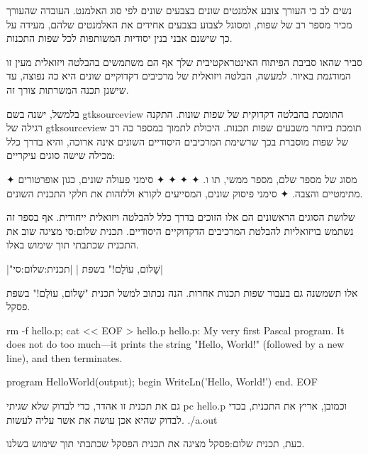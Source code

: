 נשים לב כי העורך צובע אלמנטים שונים בצבעים שונים לפי סוג האלמנט. העובדה שהעורך
מכיר מספר רב של שפות, ומסוגל לצבוע בצבעים אחידים את האלמנטים שלהם, מעידה על כך
שישנם אבני בנין יסודיות המשותפות לכל שפות התכנות.


סביר שה או סביבת הפיתוח האינטראקטיבית שלך אף הם משתמשים בהבלטה ויזואלית
מעין זו המודגמת באיור. למעשה, הבלטה ויזואלית של מרכיבים דקדוקיים שונים היא כה
נפוצה, עד שישנן  תכנה המשרתות צורך זה.

ב למשל, ישנה  בשם gtksourceview התומכת בהבלטה דקדוקית של שפות
שונות. התקנה רגילה של gtksourceview תומכת ביותר משבעים שפות תכנות. היכולת
לתמוך במספר כה רב של שפות מוסברת בכך שרשימת המרכיבים היסודיים השונים אינה
ארוכה, והיא בדרך כלל מכילה שישה סוגים עיקריים:
\begin{ספרור}
✦  מסוג של מספר שלם, מספר ממשי, תו ו.
✦ 
✦ 
✦ 
✦ סימני פעולה שונים, כגון אופרטורים מתימטיים והצבה.
✦ סימני פיסוק שונים, המסייעים לקורא ול לזהות את חלקי התכנית השונים.
\end{ספרור}
שלושת הסוגים הראשונים הם אלו הזוכים בדרך כלל להבלטה ויזואלית ייחודית. אף בספר
זה נשתמש ב ויזואליות להבלטת המרכיבים הדקדוקיים היסודיים.  תכנית
שלום:סי מציגה שוב את התכנית  שכתבתי תוך שימוש ב אלו.

\begin{תכנית}
\setLTR

\setRTL
{}|"שָׁלוֹם, עוֹלָם!" בשפת |
|תכנית:שלום:סי|
\end{תכנית}

 אלו תשמשנה גם בעבור שפות תכנות אחרות. הנה נכתוב למשל תכנית "שָׁלוֹם,
עוֹלָם!" בשפת פסקל.

\begin{קוד}
rm -f hello.p; cat << EOF > hello.p
{hello.p: My very first Pascal program. It does not do
  too much---it prints the string "Hello, World!" (followed
by a new line), and then terminates.}

program HelloWorld(output);
begin
  WriteLn('Hello, World!')
end.
EOF
\END
\end{קוד}

גם את תכנית זו אהדר, כדי לבדוק שלא שגיתי
pc hello.p
\END
וכמובן, אריץ את התכנית, בכדי לבדוק שהיא אכן עושה את אשר עליה לעשות.
./a.out
\END

כעת,  תכנית שלום:פסקל מציגה את תכנית הפסקל שכתבתי תוך שימוש ב שלנו.

